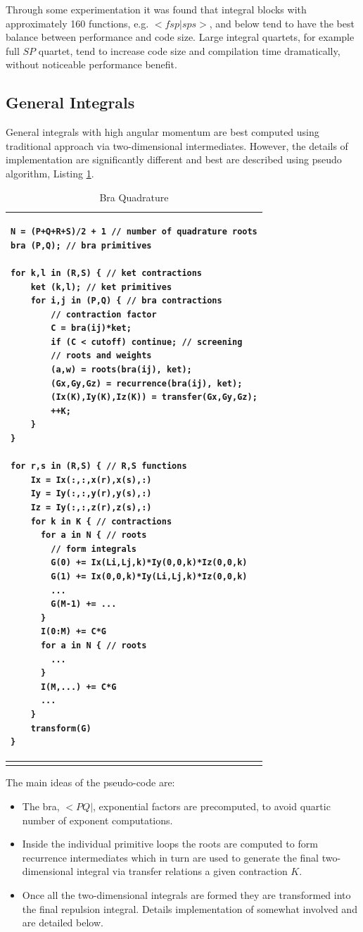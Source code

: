 \documentclass[12pt]{article}
\begin{document}
Through some experimentation it was found that integral blocks with
approximately 160 functions, e.g. $<fsp|sps>$, and below tend to have the best
balance between performance and code size.  Large integral quartets, for example
full $SP$ quartet, tend to increase code size and compilation time dramatically,
without noticeable performance benefit.

\subsection*{General Integrals}
 General integrals with high angular momentum are best computed using traditional approach
via two-dimensional intermediates.  However, the details of implementation are
significantly different and best are described using pseudo algorithm, Listing
\ref{quadrature1}.


\begin{table}
\begin{tabular}{ p{6in} }
\hline
\begin{verbatim}
N = (P+Q+R+S)/2 + 1 // number of quadrature roots
bra (P,Q); // bra primitives

for k,l in (R,S) { // ket contractions
    ket (k,l); // ket primitives
    for i,j in (P,Q) { // bra contractions
        // contraction factor
        C = bra(ij)*ket;
        if (C < cutoff) continue; // screening
        // roots and weights
        (a,w) = roots(bra(ij), ket);
        (Gx,Gy,Gz) = recurrence(bra(ij), ket);
        (Ix(K),Iy(K),Iz(K)) = transfer(Gx,Gy,Gz);
        ++K;
    }
}

for r,s in (R,S) { // R,S functions
    Ix = Ix(:,:,x(r),x(s),:)
    Iy = Iy(:,:,y(r),y(s),:)
    Iz = Iy(:,:,z(r),z(s),:)
    for k in K { // contractions
      for a in N { // roots
        // form integrals
        G(0) += Ix(Li,Lj,k)*Iy(0,0,k)*Iz(0,0,k)
        G(1) += Ix(0,0,k)*Iy(Li,Lj,k)*Iz(0,0,k)
        ...
        G(M-1) += ...
      }
      I(0:M) += C*G
      for a in N { // roots
        ...
      }
      I(M,...) += C*G
      ...
    }
    transform(G)
}
\end{verbatim} \\
\hline

\caption{Bra Quadrature}
\label{quadrature1}
\end{tabular}
\end{table}


The main ideas of the pseudo-code are:
\begin{itemize}
\item The bra, $<PQ|$,  exponential factors are precomputed,
  to avoid quartic number of exponent computations.
\item Inside the individual primitive loops the roots are computed to
  form recurrence intermediates which in turn are used to generate the
  final two-dimensional integral via transfer relations a given contraction $K$.
\item Once all the two-dimensional integrals are formed they
 are transformed into the final repulsion integral.  Details
  implementation of somewhat involved and are detailed below.
\end{itemize}
\end{document}
